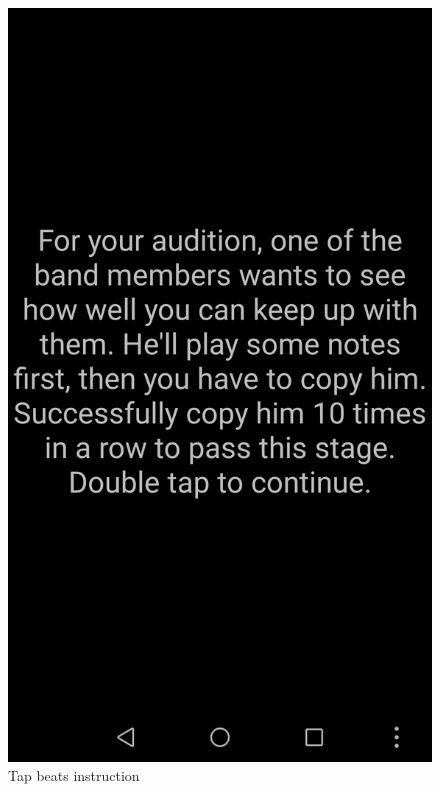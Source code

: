 \documentclass[a4paper,twoside,12pt]{book}
\begin{document}
\begin{figure}[!hb]
\centering
\begin{minipage}{.5\textwidth}
  \centering
  \includegraphics[width=.8\linewidth]{tapbit instruction.jpg}
  \caption{Tap beats instruction}
  \label{fig:Tap beats instruction}
\end{minipage}%
\begin{minipage}{.5\textwidth}
  \centering

\end{minipage}
\end{figure}
\end{document}
